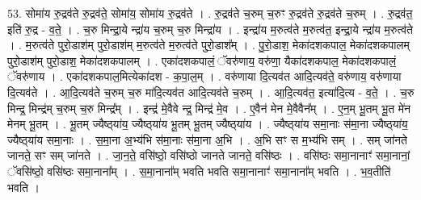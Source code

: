 \documentclass[17pt]{extarticle}
\begin{document}
53. सोमा॑य रु॒द्रव॑ते रु॒द्रव॑ते॒ सोमा॑य॒ सोमा॑य रु॒द्रव॑ते । . रु॒द्रव॑ते च॒रुम् च॒रुꣳ रु॒द्रव॑ते रु॒द्रव॑ते च॒रुम् । . रु॒द्रव॑त॒ इति॑ रु॒द्र - व॒ते॒ । . च॒रु मिन्द्रा॒ये न्द्रा॑य च॒रुम् च॒रु मिन्द्रा॑य । . इन्द्रा॑य म॒रुत्व॑ते म॒रुत्व॑त॒ इन्द्रा॒ये न्द्रा॑य म॒रुत्व॑ते । . म॒रुत्व॑ते पुरो॒डाश॑म् पुरो॒डाश॑म् म॒रुत्व॑ते म॒रुत्व॑ते पुरो॒डाश᳚म् । . पु॒रो॒डाश॒ मेका॑दशकपाल॒ मेका॑दशकपालम् पुरो॒डाश॑म् पुरो॒डाश॒ मेका॑दशकपालम् । . एका॑दशकपालं॒ ॅवरु॑णाय॒ वरु॑णा॒ यैका॑दशकपाल॒ मेका॑दशकपालं॒ ॅवरु॑णाय । . एका॑दशकपाल॒मित्येका॑दश - क॒पा॒ल॒म् । . वरु॑णाया दि॒त्यव॑त आदि॒त्यव॑ते॒ वरु॑णाय॒ वरु॑णाया दि॒त्यव॑ते । . आ॒दि॒त्यव॑ते च॒रुम् च॒रु मा॑दि॒त्यव॑त आदि॒त्यव॑ते च॒रुम् । . आ॒दि॒त्यव॑त॒ इत्या॑दि॒त्य - व॒ते॒ । . च॒रु मिन्द्र॒ मिन्द्र॑म् च॒रुम् च॒रु मिन्द्र᳚म् । . इन्द्र॑ मे॒वैवे न्द्र॒ मिन्द्र॑ मे॒व । . ए॒वैन॑ मेन मे॒वैवैन᳚म् । . ए॒न॒म् भू॒तम् भू॒त मे॑न मेनम् भू॒तम् । . भू॒तम् ज्यैष्ठ्‍या॑य॒ ज्यैष्ठ्‍या॑य भू॒तम् भू॒तम् ज्यैष्ठ्‍या॑य । . ज्यैष्ठ्‍या॑य समा॒नाः स॑मा॒ना ज्यैष्ठ्‍या॑य॒ ज्यैष्ठ्‍या॑य समा॒नाः । . स॒मा॒ना अ॒भ्य॑भि स॑मा॒नाः स॑मा॒ना अ॒भि । . अ॒भि सꣳ स म॒भ्य॑भि सम् । . सम् जा॑नते जानते॒ सꣳ सम् जा॑नते । . जा॒न॒ते॒ वसि॑ष्ठो॒ वसि॑ष्ठो जानते जानते॒ वसि॑ष्ठः । . वसि॑ष्ठः समा॒नानाꣳ॑ समा॒नानां॒ ॅवसि॑ष्ठो॒ वसि॑ष्ठः समा॒नाना᳚म् । . स॒मा॒नाना᳚म् भवति भवति समा॒नानाꣳ॑ समा॒नाना᳚म् भवति । . भ॒व॒तीति॑ भवति । \newline
\end{document}
